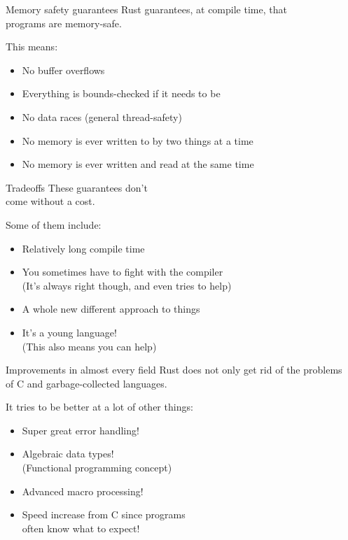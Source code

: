 \documentclass[usenames,dvipsnames,10pt,aspectratio=169]{beamer}
\begin{document}
\begin{frame}{Memory safety guarantees}
\large
Rust guarantees, at compile time, that\\
programs are memory-safe.\\

\vspace{0.3cm}

This means:
\begin{itemize}[label=$\bullet$]
	\item No buffer overflows
	\item Everything is bounds-checked if it needs to be
	\item No data races (general thread-safety)
	\item No memory is ever written to by two things at a time
	\item No memory is ever written and read at the same time
\end{itemize}
\end{frame}

\begin{frame}{Tradeoffs}
\large
These guarantees don't\\
come without a cost.

\vspace{0.3cm}

Some of them include:
\begin{itemize}[label=$\bullet$]
	\item Relatively long compile time
	\item You sometimes have to fight with the compiler\\
		(It's always right though, and even tries to help)
	\item A whole new different approach to things
	\item It's a young language!\\
		(This also means you can help)
\end{itemize}
\end{frame}

\begin{frame}{Improvements in almost every field} 
	\large
Rust does not only get rid of the problems\\
of C and garbage-collected languages.
\vspace{0.3cm}

It tries to be better at a lot of other things:
\begin{itemize}[label=$\bullet$]
	\item Super great error handling!
	\item Algebraic data types!\\
		(Functional programming concept)
	\item Advanced macro processing!
	\item Speed increase from C since programs \\
		often know what to expect!
\end{itemize}
\end{frame}
\end{document}
